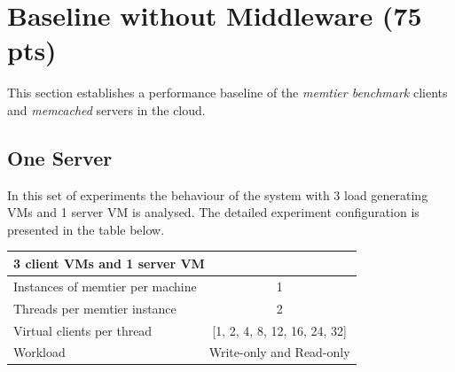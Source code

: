 \documentclass[report.tex]{subfiles}
\begin{document}
\section{Baseline without Middleware (75 pts)}\label{exp2}

This section establishes a performance baseline of the \emph{memtier benchmark} clients and \emph{memcached} servers in the cloud.

\subsection{One Server}\label{exp21}



In this set of experiments the behaviour of the system with 3 load generating VMs and 1 server VM is analysed. The detailed experiment configuration is presented in the table below.


\begin{center}
	\scriptsize{
		\begin{tabular}{|l|c|}
			\multicolumn{2}{l}{3 client VMs and 1 server VM}\\
			\hline Instances of memtier per machine & 1                        \\ 
			\hline Threads per memtier instance     & 2                        \\
			\hline Virtual clients per thread       & [1, 2, 4, 8, 12, 16, 24, 32]\\ 
			\hline Workload                         & Write-only and Read-only \\
			\hline 
		\end{tabular}
	}
\end{center}
\end{document}
